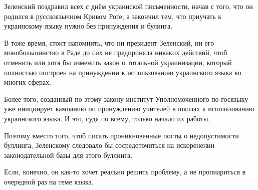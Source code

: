 \begin{center}
  \begin{fminipage}{0.7\textwidth}
Зеленский поздравил всех с днём украинской письменности, начав с того, что он
родился в русскоязычном Кривом Роге, а закончил тем, что приучать к
украинскому языку нужно без принуждения и булинга.

В тоже время, стоит напомнить, что ни президент Зеленский, ни его
монобольшинство в Раде до сих не предприняла никаких действий, чтоб
отменить или хотя бы изменить закон о тотальной украинизации, который
полностью построен на принуждении к использованию украинского языка
во многих сферах.

Более того, созданный по этому закону институт Уполномоченного по госязыку уже
инициирует кампанию по принуждению учителей в школах к использованию
украинского языка. И это, судя по всему, только начало их работы.

Поэтому вместо того, чтоб писать проникновенные посты о недопустимости
буллинга, Зеленскому следовало бы сосредоточиться на искоренении
законодательной базы для этого буллинга.

Если, конечно, он как-то хочет реально решить проблему, а не пропиариться в
очередной раз на теме языка.

  
  \end{fminipage}
\end{center}
  
